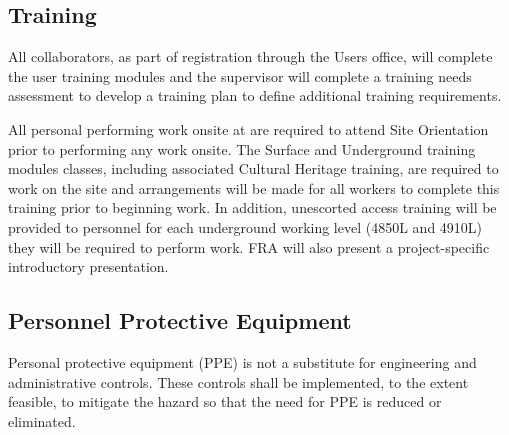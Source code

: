 \subsection{ Training}

All  collaborators, as part of registration through the \fnal Users office,
will complete the user  training modules and the supervisor
will complete a training needs assessment to develop a training plan
to define additional   training requirements.

All personal performing work onsite at  are required to attend
  Site Orientation prior to performing any work
onsite.  The  Surface and Underground training modules classes,
including associated Cultural Heritage training, are required to work
on the site and arrangements will be made for all workers to complete
this training prior to beginning work. In addition, unescorted access
training will be provided to personnel for each underground working
level (4850L and 4910L) they will be required to perform work.  FRA
will also present a project-specific introductory 
presentation. 

\subsection{Personnel Protective Equipment}

Personal protective equipment (PPE) is not a substitute for
engineering and administrative controls. These controls shall be
implemented, to the extent feasible, to mitigate the hazard so that
the need for PPE is reduced or eliminated.

